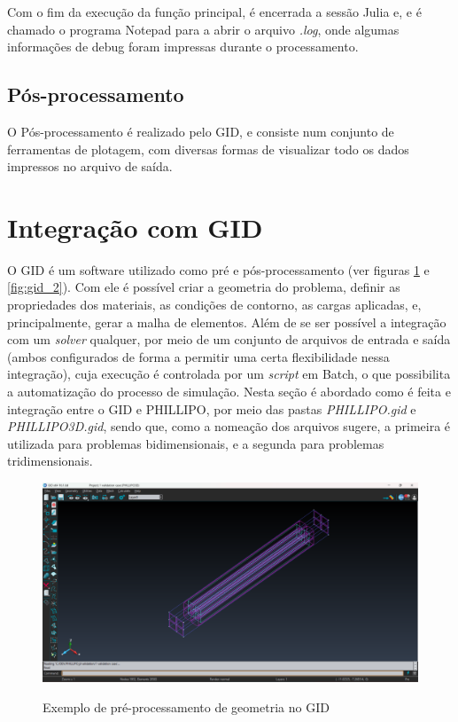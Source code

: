 Com o fim da execução da função principal, é encerrada a sessão Julia e, e é chamado o programa Notepad para a abrir o arquivo \emph{.log}, onde algumas informações de debug foram impressas durante o processamento. 

\subsection{Pós-processamento}


O Pós-processamento é realizado pelo GID, e consiste num conjunto de ferramentas de plotagem, com diversas formas de visualizar todo os dados impressos no arquivo de saída.

\section{Integração com GID}

O GID é um software utilizado como pré e pós-processamento (ver figuras \ref{fig:gid_1} e \ref{fig:gid_2}). Com ele é possível criar a geometria do problema, definir as propriedades dos materiais, as condições de contorno, as cargas aplicadas, e, principalmente, gerar a malha de elementos. Além de se ser possível a integração com um \emph{solver} qualquer, por meio de um conjunto de arquivos de entrada e saída (ambos configurados de forma a permitir uma certa flexibilidade nessa integração), cuja execução é controlada por um \emph{script} em Batch, o que possibilita a automatização do processo de simulação. Nesta seção é abordado como é feita e integração entre o GID e PHILLIPO, por meio das pastas \emph{PHILLIPO.gid} e \emph{PHILLIPO3D.gid}, sendo que, como a nomeação dos arquivos sugere, a primeira é utilizada para problemas bidimensionais, e a segunda para problemas tridimensionais.

\begin{figure}[hbtp]
    \centering
    \caption{Exemplo de pré-processamento de geometria no GID}
    \includegraphics[width = \textwidth]{Figuras/gid_1.png}
    \label{fig:gid_1}
\end{figure}

